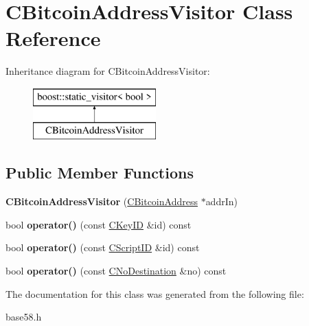 \hypertarget{class_c_bitcoin_address_visitor}{}\section{C\+Bitcoin\+Address\+Visitor Class Reference}
\label{class_c_bitcoin_address_visitor}
Inheritance diagram for C\+Bitcoin\+Address\+Visitor\+:\begin{figure}[H]
\begin{center}
\leavevmode
\includegraphics[height=2.000000cm]{class_c_bitcoin_address_visitor}
\end{center}
\end{figure}
\subsection*{Public Member Functions}
\begin{DoxyCompactItemize}
\item 
\mbox{\label{class_c_bitcoin_address_visitor_a1d975359ea720c35340c013bd3a3a313}} 
{\bfseries C\+Bitcoin\+Address\+Visitor} (\mbox{\hyperlink{class_c_bitcoin_address}{C\+Bitcoin\+Address}} $\ast$addr\+In)
\item 
\mbox{\label{class_c_bitcoin_address_visitor_ae33e418ab00c996f042e988a2045cfd0}} 
bool {\bfseries operator()} (const \mbox{\hyperlink{class_c_key_i_d}{C\+Key\+ID}} \&id) const
\item 
\mbox{\label{class_c_bitcoin_address_visitor_a99df3506ddf56040867cea157e7cf8d7}} 
bool {\bfseries operator()} (const \mbox{\hyperlink{class_c_script_i_d}{C\+Script\+ID}} \&id) const
\item 
\mbox{\label{class_c_bitcoin_address_visitor_a5f8c6c6329537265a641e7f98bc64c68}} 
bool {\bfseries operator()} (const \mbox{\hyperlink{class_c_no_destination}{C\+No\+Destination}} \&no) const
\end{DoxyCompactItemize}


The documentation for this class was generated from the following file\+:\begin{DoxyCompactItemize}
\item 
base58.\+h\end{DoxyCompactItemize}
